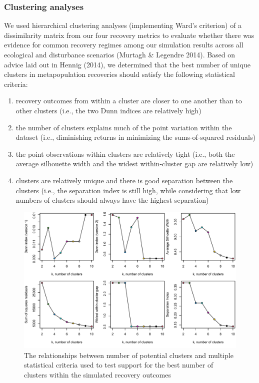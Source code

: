 \documentclass[
]{article}
\providecommand{\tightlist}{%
  \setlength{\itemsep}{0pt}\setlength{\parskip}{0pt}}
\begin{document}
\newpage

\hypertarget{clustering-analyses}{%
\subsubsection{Clustering analyses}\label{clustering-analyses}}

We used hierarchical clustering analyses (implementing Ward's criterion)
of a dissimilarity matrix from our four recovery metrics to evaluate
whether there was evidence for common recovery regimes among our
simulation results across all ecological and disturbance scenarios
(Murtagh \& Legendre 2014). Based on advice laid out in Hennig (2014),
we determined that the best number of unique clusters in metapopulation
recoveries should satisfy the following statistical criteria:

\begin{enumerate}
\def\labelenumi{\arabic{enumi}.}
\tightlist
\item
  recovery outcomes from within a cluster are closer to one another than
  to other clusters (i.e., the two Dunn indices are relatively high)
\item
  the number of clusters explains much of the point variation within the
  dataset (i.e., diminishing returns in minimizing the sums-of-squared
  residuals)
\item
  the point observations within clusters are relatively tight (i.e.,
  both the average silhouette width and the widest within-cluster gap
  are relatively low)
\item
  clusters are relatively unique and there is good separation between
  the clusters (i.e., the separation index is still high, while
  considering that low numbers of clusters should always have the
  highest separation)
\end{enumerate}

\begin{figure}[H]

{\centering \includegraphics{Managing_for_ecological_surprises_in_metapopulations_files/figure-latex/clustering analysis-1} 

}

\caption{The relationships between number of potential clusters and multiple statistical criteria used to test support for the best number of clusters within the simulated recovery outcomes}\label{fig:clustering analysis}
\end{figure}
\end{document}
